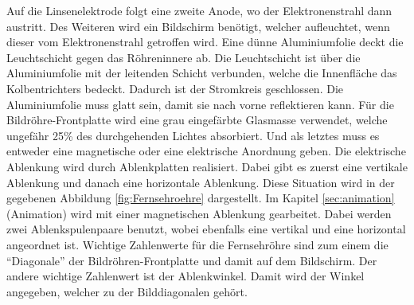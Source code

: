 Auf die Linsenelektrode folgt eine zweite Anode, wo der Elektronenstrahl dann austritt.
Des Weiteren wird ein Bildschirm benötigt, welcher aufleuchtet, wenn dieser vom Elektronenstrahl getroffen wird.
Eine dünne Aluminiumfolie deckt die Leuchtschicht gegen das Röhreninnere ab.
Die Leuchtschicht ist über die Aluminiumfolie mit der leitenden Schicht verbunden, welche die Innenfläche das Kolbentrichters bedeckt.
Dadurch ist der Stromkreis geschlossen.
Die Aluminiumfolie muss glatt sein, damit sie nach vorne reflektieren kann.
Für die Bildröhre-Frontplatte wird eine grau eingefärbte Glasmasse verwendet, welche ungefähr 25\% des durchgehenden Lichtes absorbiert.
Und als letztes muss es entweder eine magnetische oder eine elektrische Anordnung geben.
Die elektrische Ablenkung wird durch Ablenkplatten realisiert.
Dabei gibt es zuerst eine vertikale Ablenkung und danach eine horizontale Ablenkung.
Diese Situation wird in der gegebenen Abbildung \ref{fig:Fernsehroehre} dargestellt.
Im Kapitel \ref{sec:animation} (Animation) wird mit einer magnetischen Ablenkung gearbeitet.
Dabei werden zwei Ablenkspulenpaare benutzt, wobei ebenfalls eine vertikal und eine horizontal angeordnet ist.
Wichtige Zahlenwerte für die Fernsehröhre sind zum einem die "`Diagonale"' der Bildröhren-Frontplatte und damit auf dem Bildschirm.
Der andere wichtige Zahlenwert ist der Ablenkwinkel.
Damit wird der Winkel angegeben, welcher zu der Bilddiagonalen gehört.

